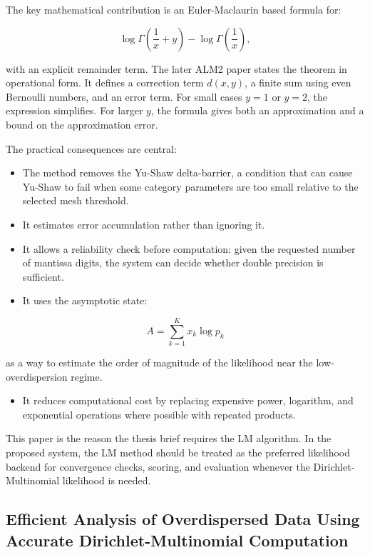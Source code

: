 \documentclass[11pt,a4paper]{article}
\begin{document}
The key mathematical contribution is an Euler-Maclaurin based formula for:

\[
\log\Gamma\left(\frac{1}{x}+y\right)-\log\Gamma\left(\frac{1}{x}\right),
\]

with an explicit remainder term. The later ALM2 paper states the theorem in operational form. It defines a correction term \(d(x,y)\), a finite sum using even Bernoulli numbers, and an error term. For small cases \(y=1\) or \(y=2\), the expression simplifies. For larger \(y\), the formula gives both an approximation and a bound on the approximation error.

The practical consequences are central:

\begin{itemize}
  \item The method removes the Yu-Shaw delta-barrier, a condition that can cause Yu-Shaw to fail when some category parameters are too small relative to the selected mesh threshold.
  \item It estimates error accumulation rather than ignoring it.
  \item It allows a reliability check before computation: given the requested number of mantissa digits, the system can decide whether double precision is sufficient.
  \item It uses the asymptotic state:
\end{itemize}

\[
A=\sum_{k=1}^{K}x_k\log p_k
\]

as a way to estimate the order of magnitude of the likelihood near the low-overdispersion regime.

\begin{itemize}
  \item It reduces computational cost by replacing expensive power, logarithm, and exponential operations where possible with repeated products.
\end{itemize}

This paper is the reason the thesis brief requires the LM algorithm. In the proposed system, the LM method should be treated as the preferred likelihood backend for convergence checks, scoring, and evaluation whenever the Dirichlet-Multinomial likelihood is needed.

\subsection{Efficient Analysis of Overdispersed Data Using Accurate Dirichlet-Multinomial Computation}
\end{document}
